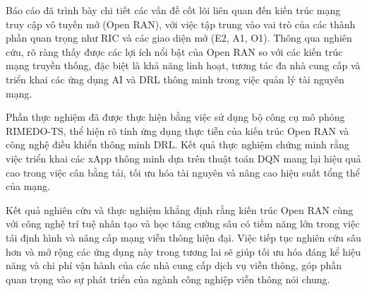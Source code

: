 Báo cáo đã trình bày chi tiết các vấn đề cốt lõi liên quan đến kiến trúc mạng truy cập vô tuyến mở (Open RAN), với việc tập trung vào vai trò của các thành phần quan trọng như RIC và các giao diện mở (E2, A1, O1). Thông qua nghiên cứu, rõ ràng thấy được các lợi ích nổi bật của Open RAN so với các kiến trúc mạng truyền thống, đặc biệt là khả năng linh hoạt, tương tác đa nhà cung cấp và triển khai các ứng dụng AI và DRL thông minh trong việc quản lý tài nguyên mạng.

Phần thực nghiệm đã được thực hiện bằng việc sử dụng bộ công cụ mô phỏng RIMEDO-TS, thể hiện rõ tính ứng dụng thực tiễn của kiến trúc Open RAN và công nghệ điều khiển thông minh DRL. Kết quả thực nghiệm chứng minh rằng việc triển khai các xApp thông minh dựa trên thuật toán DQN mang lại hiệu quả cao trong việc cân bằng tải, tối ưu hóa tài nguyên và nâng cao hiệu suất tổng thể của mạng.

Kết quả nghiên cứu và thực nghiệm khẳng định rằng kiến trúc Open RAN cùng với công nghệ trí tuệ nhân tạo và học tăng cường sâu có tiềm năng lớn trong việc tái định hình và nâng cấp mạng viễn thông hiện đại. Việc tiếp tục nghiên cứu sâu hơn và mở rộng các ứng dụng này trong tương lai sẽ giúp tối ưu hóa đáng kể hiệu năng và chi phí vận hành của các nhà cung cấp dịch vụ viễn thông, góp phần quan trọng vào sự phát triển của ngành công nghiệp viễn thông nói chung.

